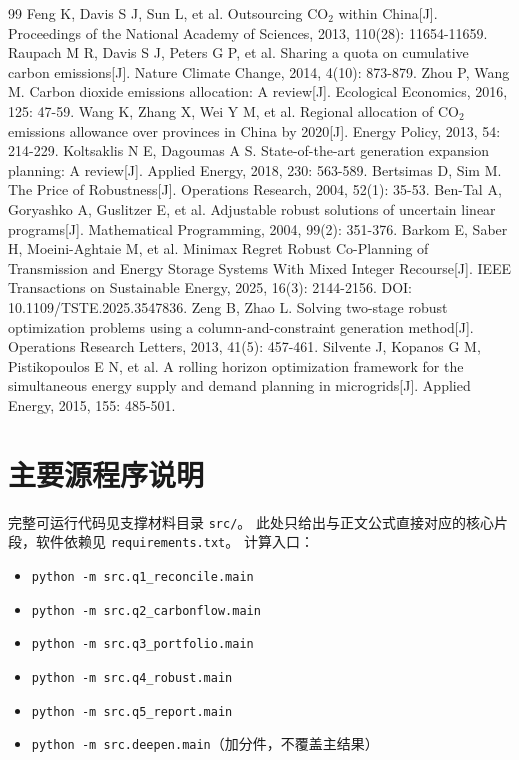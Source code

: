 \documentclass[UTF8,a4paper,zihao=-4,fontset=fandol]{ctexart}
\begin{document}
\begin{sloppypar}
\begin{thebibliography}{99}
 Feng K, Davis S J, Sun L, et al. Outsourcing CO$_2$ within China[J]. Proceedings of the National Academy of Sciences, 2013, 110(28): 11654-11659.
 Raupach M R, Davis S J, Peters G P, et al. Sharing a quota on cumulative carbon emissions[J]. Nature Climate Change, 2014, 4(10): 873-879.
 Zhou P, Wang M. Carbon dioxide emissions allocation: A review[J]. Ecological Economics, 2016, 125: 47-59.
 Wang K, Zhang X, Wei Y M, et al. Regional allocation of CO$_2$ emissions allowance over provinces in China by 2020[J]. Energy Policy, 2013, 54: 214-229.
 Koltsaklis N E, Dagoumas A S. State-of-the-art generation expansion planning: A review[J]. Applied Energy, 2018, 230: 563-589.
 Bertsimas D, Sim M. The Price of Robustness[J]. Operations Research, 2004, 52(1): 35-53.
 Ben-Tal A, Goryashko A, Guslitzer E, et al. Adjustable robust solutions of uncertain linear programs[J]. Mathematical Programming, 2004, 99(2): 351-376.
 Barkom E, Saber H, Moeini-Aghtaie M, et al. Minimax Regret Robust Co-Planning of Transmission and Energy Storage Systems With Mixed Integer Recourse[J]. IEEE Transactions on Sustainable Energy, 2025, 16(3): 2144-2156. DOI: 10.1109/TSTE.2025.3547836.
 Zeng B, Zhao L. Solving two-stage robust optimization problems using a column-and-constraint generation method[J]. Operations Research Letters, 2013, 41(5): 457-461.
 Silvente J, Kopanos G M, Pistikopoulos E N, et al. A rolling horizon optimization framework for the simultaneous energy supply and demand planning in microgrids[J]. Applied Energy, 2015, 155: 485-501.
\end{thebibliography}
\end{sloppypar}

\newpage
\appendix
\section{主要源程序说明}
{\sloppy
完整可运行代码见支撑材料目录 \texttt{src/}。
此处只给出与正文公式直接对应的核心片段，软件依赖见 \texttt{requirements.txt}。
}
计算入口：
\begin{itemize}[leftmargin=2.2em]
\item \texttt{python -m src.q1\_reconcile.main}
\item \texttt{python -m src.q2\_carbonflow.main}
\item \texttt{python -m src.q3\_portfolio.main}
\item \texttt{python -m src.q4\_robust.main}
\item \texttt{python -m src.q5\_report.main}
\item \texttt{python -m src.deepen.main}（加分件，不覆盖主结果）
\end{itemize}
\end{document}
